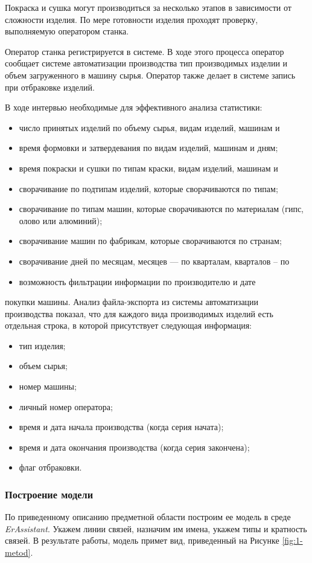 \documentclass[a4paper,14pt]{extarticle}
\newcommand{\erassistant}{\textit{ErAssistant}}
\begin{document}
Покраска и сушка могут производиться за несколько этапов в зависимости
от сложности изделия. По мере готовности изделия проходят проверку,
выполняемую оператором станка.

Оператор станка регистрируется в системе. В ходе этого процесса оператор
сообщает системе автоматизации производства тип производимых изделии и
объем загруженного в машину сырья. Оператор также делает в системе запись
при отбраковке изделий.

В ходе
интервью необходимые для эффективного анализа статистики:
\begin{itemize}

\item  число принятых изделий по объему сырья, видам изделий, машинам и
\item  время формовки и затвердевания по видам изделий, машинам и дням;
\item  время покраски и сушки по типам краски, видам изделий, машинам и
\item  сворачивание по подтипам изделий, которые сворачиваются по типам;
\item  сворачивание по типам машин, которые сворачиваются по материалам
(гипс, олово или алюминий);
\item  сворачивание машин по фабрикам, которые сворачиваются по странам;
\item  сворачивание дней по месяцам, месяцев — по кварталам, кварталов – по
\item  возможность фильтрации информации по производителю и дате
\end{itemize}
покупки машины.
Анализ файла-экспорта из системы автоматизации производства показал,
что для каждого вида производимых изделий есть отдельная строка, в которой
присутствует следующая информация:
\begin{itemize}
	\item  тип изделия;
	\item  объем сырья;
	\item  номер машины;
	\item  личный номер оператора;
	\item  время и дата начала производства (когда серия начата);
	\item  время и дата окончания производства (когда серия закончена);
	\item  флаг отбраковки.
\end{itemize}
\subsubsection*{Построение модели}
По приведенному описанию предметной области построим ее модель в среде \erassistant. Укажем линии связей, назначим им имена, укажем типы и кратность связей. В результате работы, модель примет вид, приведенный на Рисунке \ref{fig:1-metod}.
\end{document}
